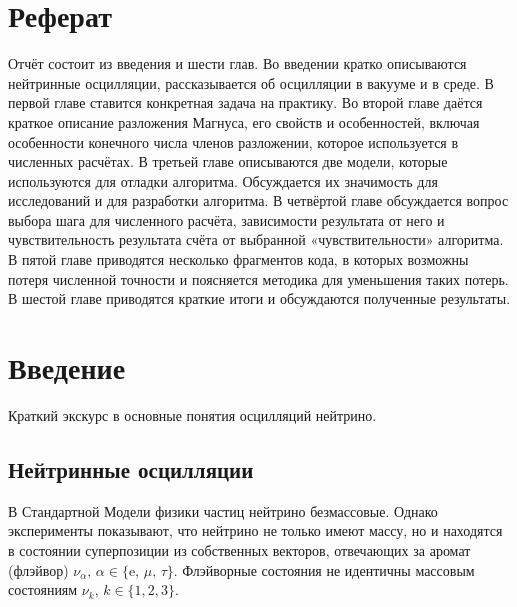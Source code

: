 \documentclass[12pt]{article}
\begin{document}
\newpage
\section*{Реферат}

Отчёт состоит из введения и шести глав. Во введении кратко описываются
нейтринные осцилляции, рассказывается об осцилляции в вакууме и в среде. В
первой главе ставится конкретная задача на практику. Во второй главе даётся
краткое описание разложения Магнуса, его свойств и особенностей, включая
особенности конечного числа членов разложении, которое используется в численных
расчётах. В третьей главе описываются две модели, которые используются для
отладки алгоритма. Обсуждается их значимость для исследований и для разработки
алгоритма. В четвёртой главе обсуждается вопрос выбора шага для численного
расчёта, зависимости результата от него и чувствительность результата счёта от
выбранной «чувствительности» алгоритма. В пятой главе приводятся несколько
фрагментов кода, в которых возможны потеря численной точности и поясняется
методика для уменьшения таких потерь. В шестой главе приводятся краткие итоги и
обсуждаются полученные результаты.

\newpage
\tableofcontents
\newpage


\setcounter{page}{4} %

\section*{Введение}
\indent
Краткий экскурс в основные понятия осцилляций нейтрино.

\subsection*{Нейтринные осцилляции}

В Стандартной Модели физики частиц нейтрино безмассовые. Однако эксперименты
показывают, что нейтрино не только имеют массу, но и находятся в состоянии
суперпозиции из собственных векторов, отвечающих за аромат (флэйвор)
$\nu_{\alpha},\,\alpha\!\in\!\{\text{e},\,\mu,\,\tau\}$. Флэйворные состояния не
идентичны массовым состояниям $\nu_{k},\,k\!\in\!\{1,2,3\}$.
	
\end{document}
